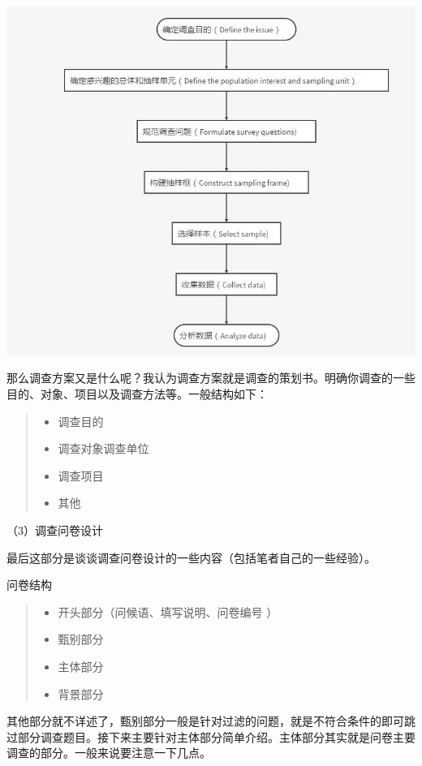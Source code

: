\documentclass[]{ctexbook}
\providecommand{\tightlist}{%
  \setlength{\itemsep}{0pt}\setlength{\parskip}{0pt}}
\begin{document}
\includegraphics[width=1\linewidth,height=0.6\textheight]{fig/fig5}

那么调查方案又是什么呢？我认为调查方案就是调查的策划书。明确你调查的一些目的、对象、项目以及调查方法等。一般结构如下：

\begin{quote}
\begin{itemize}
\tightlist
\item
  调查目的
\item
  调查对象调查单位
\item
  调查项目
\item
  其他
\end{itemize}
\end{quote}

（3）调查问卷设计

最后这部分是谈谈调查问卷设计的一些内容（包括笔者自己的一些经验）。

问卷结构

\begin{quote}
\begin{itemize}
\tightlist
\item
  开头部分（问候语、填写说明、问卷编号 ）
\item
  甄别部分
\item
  主体部分
\item
  背景部分
\end{itemize}
\end{quote}

其他部分就不详述了，甄别部分一般是针对过滤的问题，就是不符合条件的即可跳过部分调查题目。接下来主要针对主体部分简单介绍。主体部分其实就是问卷主要调查的部分。一般来说要注意一下几点。
\end{document}
